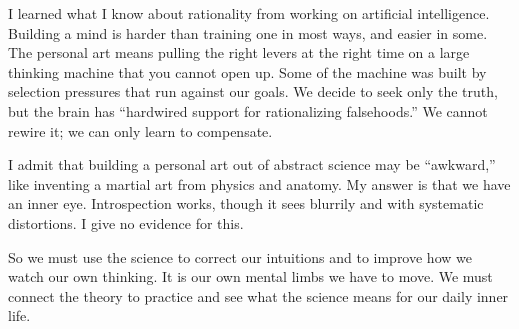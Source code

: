 I learned what I know about rationality from working on artificial intelligence. Building a mind is harder than training one in most ways, and easier in some. The personal art means pulling the right levers at the right time on a large thinking machine that you cannot open up. Some of the machine was built by selection pressures that run against our goals. We decide to seek only the truth, but the brain has ``hardwired support for rationalizing falsehoods.'' We cannot rewire it; we can only learn to compensate.

I admit that building a personal art out of abstract science may be ``awkward,'' like inventing a martial art from physics and anatomy. My answer is that we have an inner eye. Introspection works, though it sees blurrily and with systematic distortions. I give no evidence for this. 

So we must use the science to correct our intuitions and to improve how we watch our own thinking. It is our own mental limbs we have to move. We must connect the theory to practice and see what the science means for our daily inner life.
